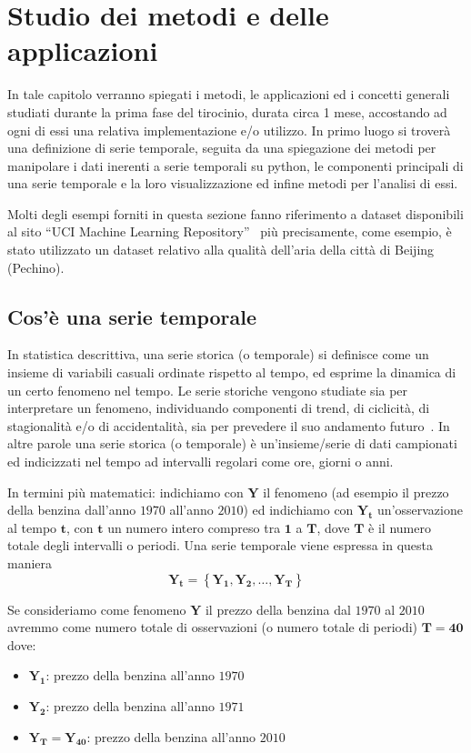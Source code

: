 \section{Studio dei metodi e delle applicazioni}
In tale capitolo verranno spiegati i metodi, le applicazioni ed i concetti 
generali studiati durante la prima fase del tirocinio, durata circa 1 mese, accostando ad ogni 
di essi una relativa implementazione e/o utilizzo.
In primo luogo si troverà una definizione di serie temporale, seguita da
una spiegazione dei metodi per manipolare i dati inerenti a serie temporali 
su python, le componenti principali di una serie temporale e la loro visualizzazione
ed infine metodi per l'analisi di essi.

Molti degli esempi forniti in questa sezione fanno riferimento a dataset disponibili
al sito ``UCI Machine Learning Repository''~\cite{dua:2019} più precisamente, come
esempio, è stato utilizzato un dataset relativo alla qualità dell'aria della città di
Beijing~\cite{dua:air_quality} (Pechino).
 
\subsection{Cos'è una serie temporale}
In statistica descrittiva, una serie storica (o temporale) si definisce come un insieme di variabili 
casuali ordinate rispetto al tempo, ed esprime la dinamica di un certo 
fenomeno nel tempo. Le serie storiche vengono studiate sia per 
interpretare un fenomeno, individuando componenti di trend, di ciclicità, 
di stagionalità e/o di accidentalità, sia per prevedere il suo 
andamento futuro~\cite{wiki:serie_storica}.
In altre parole una serie storica (o temporale) è un'insieme/serie di dati
campionati ed indicizzati nel tempo ad intervalli regolari come ore, giorni 
o anni.

In termini più matematici: indichiamo con $\bm{Y}$ il fenomeno (ad esempio 
il prezzo della benzina dall'anno $1970$ all'anno $2010$) ed indichiamo con
$\bm{Y_t}$ un'osservazione al tempo $\bm{t}$, con $\bm{t}$ un numero intero
compreso tra $\bm{1}$ a $\bm{T}$, dove $\bm{T}$ è il numero totale degli intervalli o 
periodi. Una serie temporale viene espressa in questa maniera 
\[ \bm{Y_t} = \left\{  \bm{Y_1}, \bm{Y_2}, \dots , \bm{Y_T}  \right\} \]

\begin{esempio} 
    Se consideriamo come fenomeno $\bm{Y}$ il prezzo della benzina dal $1970$ al $2010$
    avremmo come numero totale di osservazioni (o numero totale di periodi) 
    $\bm{T} = \bm{40}$ dove:
    \begin{itemize}
        \setlength\itemsep{-0.5em}
        \item $\bm{Y_1}$: prezzo della benzina all'anno $1970$
        \item $\bm{Y_2}$: prezzo della benzina all'anno $1971$
        \item $\bm{Y_T} = \bm{Y_{40}}$: prezzo della benzina all'anno $2010$
    \end{itemize}

\end{esempio}